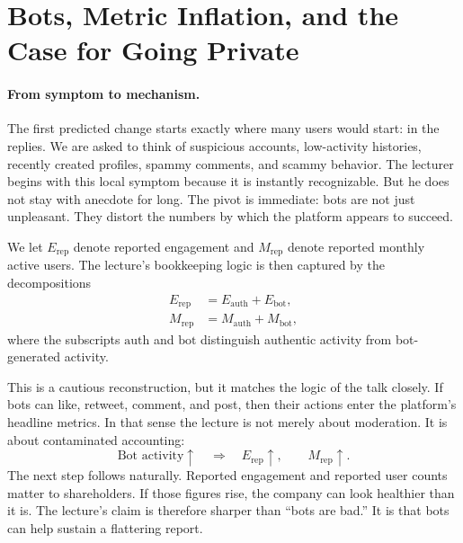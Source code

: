 \section{Bots, Metric Inflation, and the Case for Going Private}

\paragraph{From symptom to mechanism.}
The first predicted change starts exactly where many users would start: in the replies. We are asked to think of suspicious accounts, low-activity histories, recently created profiles, spammy comments, and scammy behavior. The lecturer begins with this local symptom because it is instantly recognizable. But he does not stay with anecdote for long. The pivot is immediate: bots are not just unpleasant. They distort the numbers by which the platform appears to succeed.

\begin{definition}
We let \(E_{\mathrm{rep}}\) denote reported engagement and \(M_{\mathrm{rep}}\) denote reported monthly active users. The lecture's bookkeeping logic is then captured by the decompositions
\begin{align}
E_{\mathrm{rep}} &= E_{\mathrm{auth}} + E_{\mathrm{bot}}, \\
M_{\mathrm{rep}} &= M_{\mathrm{auth}} + M_{\mathrm{bot}},
\end{align}
where the subscripts \(\mathrm{auth}\) and \(\mathrm{bot}\) distinguish authentic activity from bot-generated activity.
\end{definition}

This is a cautious reconstruction, but it matches the logic of the talk closely. If bots can like, retweet, comment, and post, then their actions enter the platform's headline metrics. In that sense the lecture is not merely about moderation. It is about contaminated accounting:
\begin{equation}
\text{Bot activity} \uparrow
\quad \Longrightarrow \quad
E_{\mathrm{rep}} \uparrow,\qquad
M_{\mathrm{rep}} \uparrow.
\end{equation}
The next step follows naturally. Reported engagement and reported user counts matter to shareholders. If those figures rise, the company can look healthier than it is. The lecture's claim is therefore sharper than ``bots are bad.'' It is that bots can help sustain a flattering report.

